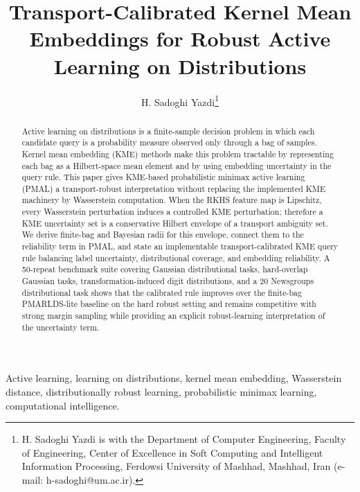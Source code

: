 \documentclass[10pt,journal]{IEEEtran}
\begin{document}
\title{Transport-Calibrated Kernel Mean Embeddings for Robust Active Learning on Distributions}

\author{H. Sadoghi Yazdi\thanks{H. Sadoghi Yazdi is with the Department of Computer Engineering, Faculty of Engineering, Center of Excellence in Soft Computing and Intelligent Information Processing, Ferdowsi University of Mashhad, Mashhad, Iran (e-mail: h-sadoghi@um.ac.ir).}}


\maketitle

\begin{abstract}
Active learning on distributions is a finite-sample decision problem in which each candidate query is a probability measure observed only through a bag of samples. Kernel mean embedding (KME) methods make this problem tractable by representing each bag as a Hilbert-space mean element and by using embedding uncertainty in the query rule. This paper gives KME-based probabilistic minimax active learning (PMAL) a transport-robust interpretation without replacing the implemented KME machinery by Wasserstein computation. When the RKHS feature map is Lipschitz, every Wasserstein perturbation induces a controlled KME perturbation; therefore a KME uncertainty set is a conservative Hilbert envelope of a transport ambiguity set. We derive finite-bag and Bayesian radii for this envelope, connect them to the reliability term in PMAL, and state an implementable transport-calibrated KME query rule balancing label uncertainty, distributional coverage, and embedding reliability. A 50-repeat benchmark suite covering Gaussian distributional tasks, hard-overlap Gaussian tasks, transformation-induced digit distributions, and a 20 Newsgroups distributional task shows that the calibrated rule improves over the finite-bag PMARLDS-lite baseline on the hard robust setting and remains competitive with strong margin sampling while providing an explicit robust-learning interpretation of the uncertainty term.
\end{abstract}

\begin{IEEEkeywords}
Active learning, learning on distributions, kernel mean embedding, Wasserstein distance, distributionally robust learning, probabilistic minimax learning, computational intelligence.
\end{IEEEkeywords}
\end{document}
